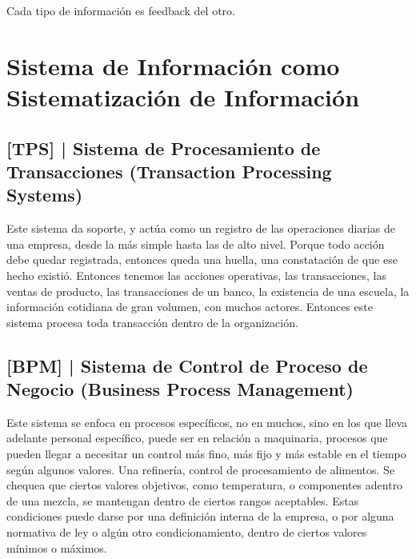 Cada tipo de información es feedback del otro.

\hypertarget{sistema-de-informaciuxf3n-como-sistematizaciuxf3n-de-informaciuxf3n-6}{%
\section{Sistema de Información como Sistematización de Información}\label{sistema-de-informaciuxf3n-como-sistematizaciuxf3n-de-informaciuxf3n-6}}

\hypertarget{sistema-de-procesamiento-de-transacciones-tps}{%
\subsection{%
{[}TPS{]} |
Sistema de Procesamiento de Transacciones
(Transaction Processing Systems)
}\label{sistema-de-procesamiento-de-transacciones-tps}}

Este sistema da soporte, y actúa como un registro de las operaciones
diarias de una empresa, desde la más simple hasta las de alto nivel.
Porque todo acción debe quedar registrada, entonces queda una huella,
una constatación de que ese hecho existió. Entonces tenemos las acciones
operativas, las transacciones, las ventas de producto, las transacciones
de un banco, la existencia de una escuela, la información cotidiana de
gran volumen, con muchos actores. Entonces este sistema procesa toda
transacción dentro de la organización.

\hypertarget{sistema-de-control-de-proceso-de-negocio-bpm}{%
\subsection{%
{[}BPM{]} |
Sistema de Control de Proceso de Negocio
(Business Process Management)
}\label{sistema-de-control-de-proceso-de-negocio-bpm}}

Este sistema se enfoca en procesos específicos, no en muchos, sino en
los que lleva adelante personal específico, puede ser en relación a
maquinaria, procesos que pueden llegar a necesitar un control más fino,
más fijo y más estable en el tiempo según algunos valores. Una
refinería, control de procesamiento de alimentos. Se chequea que ciertos
valores objetivos, como temperatura, o componentes adentro de una
mezcla, se mantengan dentro de ciertos rangos aceptables. Estas
condiciones puede darse por una definición interna de la empresa, o por
alguna normativa de ley o algún otro condicionamiento, dentro de ciertos
valores mínimos o máximos.

